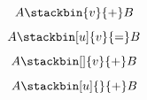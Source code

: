 \documentclass{article}
\begin{document}
\[ A \stackbin{v}{+} B \]
\[ A \stackbin[u]{v}{=} B \]
\[ A \stackbin[]{v}{+} B \]
\[ A \stackbin[u]{}{+} B \]
\end{document}
